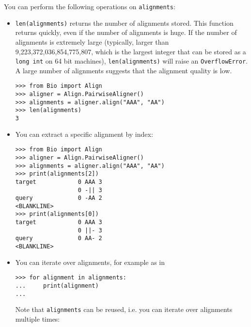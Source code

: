 You can perform the following operations on \verb+alignments+:
\begin{itemize}
\item \verb+len(alignments)+ returns the number of alignments stored. This function returns quickly, even if the number of alignments is huge. If the number of alignments is extremely large (typically, larger than 9,223,372,036,854,775,807, which is the largest integer that can be stored as a \verb+long int+ on 64 bit machines), \verb+len(alignments)+ will raise an \verb+OverflowError+. A large number of alignments suggests that the alignment quality is low.

\begin{verbatim}
>>> from Bio import Align
>>> aligner = Align.PairwiseAligner()
>>> alignments = aligner.align("AAA", "AA")
>>> len(alignments)
3
\end{verbatim}
\item You can extract a specific alignment by index:

\begin{verbatim}
>>> from Bio import Align
>>> aligner = Align.PairwiseAligner()
>>> alignments = aligner.align("AAA", "AA")
>>> print(alignments[2])
target            0 AAA 3
                  0 -|| 3
query             0 -AA 2
<BLANKLINE>
>>> print(alignments[0])
target            0 AAA 3
                  0 ||- 3
query             0 AA- 2
<BLANKLINE>
\end{verbatim}
\item You can iterate over alignments, for example as in
\begin{verbatim}
>>> for alignment in alignments:
...     print(alignment)
...
\end{verbatim}
Note that \verb+alignments+ can be reused, i.e. you can iterate over alignments multiple times:


\end{itemize}
